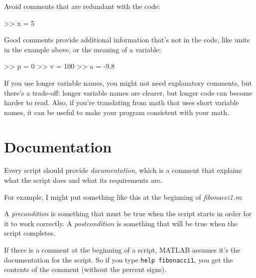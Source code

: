 Avoid comments that are redundant with the code:

\begin{code}
>> x = 5        %
\end{code}

Good comments provide additional information that's not in the
code, like units in the example above, or the meaning of a variable:

\begin{code}
>> p = 0         %
>> v = 100       %
>> a = -9.8      %
\end{code}

If you use longer variable names, you might not need explanatory
comments, but there's a trade-off: longer variable names are clearer, but longer code can become harder
to read.
Also, if you're translating from math
that uses short variable names, it can be useful to make your
program consistent with your math.


\section{Documentation}

Every script should provide \emph{documentation}, which is a comment
that explains what the script does and what its requirements are.

For example, I might put something like this at the beginning of \emph{fibonacci1.m}:


\begin{code}
\end{code}

A \emph{precondition} is something that must be true when the script
starts in order for it to work correctly.  A \emph{postcondition}
is something that will be true when the script completes.


If there is a comment at the beginning of a script, MATLAB assumes
it's the documentation for the script. So if you type \lstinline{help fibonacci1}, you get the contents of the comment (without the percent
signs).

